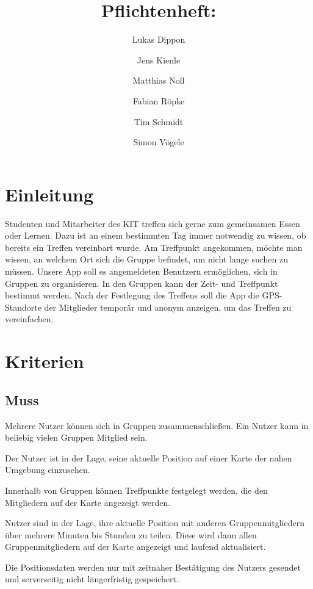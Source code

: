\documentclass[parskip=full,11pt]{scrartcl}
\title{Pflichtenheft: \producttitle}
\author{Lukas Dippon
        \and Jens Kienle
        \and Matthias Noll
        \and Fabian Röpke
        \and Tim Schmidt
        \and Simon Vögele}
\begin{document}
\maketitle

\section{Einleitung}
Studenten und Mitarbeiter des KIT treffen sich gerne zum gemeinsamen Essen oder Lernen.
Dazu ist an einem bestimmten Tag immer notwendig zu wissen, ob bereits ein Treffen vereinbart wurde.
Am Treffpunkt angekommen, möchte man wissen, an welchem Ort sich die Gruppe befindet, um nicht lange suchen zu müssen.
Unsere App soll es angemeldeten Benutzern ermöglichen, sich in Gruppen zu organisieren.
In den Gruppen kann der Zeit- und Treffpunkt bestimmt werden.
Nach der Festlegung des Treffens soll die App die GPS-Standorte der Mitglieder temporär und anonym anzeigen, um das Treffen zu vereinfachen.

\pagebreak
\section{Kriterien}

\subsection{Muss}
Mehrere Nutzer können sich in Gruppen zusammenschließen.
Ein Nutzer kann in beliebig vielen Gruppen Mitglied sein.

Der Nutzer ist in der Lage, seine aktuelle Position auf einer Karte der nahen
Umgebung einzusehen.

Innerhalb von Gruppen können Treffpunkte festgelegt werden,
die den Mitgliedern auf der Karte angezeigt werden.

Nutzer sind in der Lage, ihre aktuelle Position mit anderen Gruppenmitgliedern
über mehrere Minuten bis Stunden zu teilen.
Diese wird dann allen Gruppenmitgliedern auf der Karte angezeigt und laufend
aktualisiert.

Die Positionsdaten werden nur mit zeitnaher Bestätigung
des Nutzers gesendet und serverseitig nicht längerfristig gespeichert.
\end{document}
